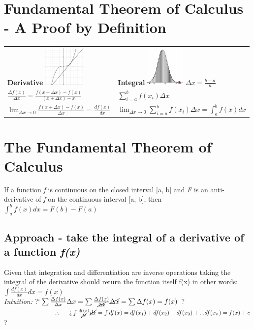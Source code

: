 \documentclass{article}
\author{Uzair Akram}
\begin{document}
\section*{Fundamental Theorem of Calculus - A Proof by Definition}

\begin{tabular}{l l}
\textbf{Derivative}  \hspace{2cm} \includegraphics[height=2cm]{derivative.png} \hspace{2cm}  &  \textbf{Integral}   \hspace{2cm}  \includegraphics[height=2cm]{integral.png}  $\Delta x = \frac{b - a}{n}$ \\
$\frac{\Delta f(x)}{\Delta x} = \frac{f(x + \Delta x) - f(x)}{(x + \Delta x) - x}$  &  $\sum\limits_{i=a}^b f(x_i)\Delta x$ \\
$\lim_{\Delta x\to 0} \frac{f(x + \Delta x) - f(x)}{\Delta x} = \frac{df(x)}{dx}$  &  $\lim_{\Delta x\to 0}\sum\limits_{i=a}^b f(x_i)\Delta x = \int_{a}^b f(x)dx$ \\
\end{tabular}
\section*{The Fundamental Theorem of Calculus}
If a function \emph{f} is continuous on the closed interval [a, b] and \emph{F} is an anti-derivative of \emph{f} on the continuous interval [a, b], then $\int_{a}^b f(x)dx = F(b) - F(a)$
\subsection*{Approach - take the integral of a derivative of a function \emph{f(x)}}
Given that integration and differentiation are inverse operations taking the integral of the derivative should return the function itself f(x) in other words:  $\int \frac{df(x)}{dx}dx = f(x)$ \\
\emph{Intuition: } ?`$\sum\frac{\Delta f(x)}{\Delta x}\Delta x = \sum\frac{\Delta f(x)}{\cancel{\Delta x}}\cancel{\Delta x} = \sum\Delta f(x) = f(x)$ ? \\
\mbox{}$\hspace{3cm} \therefore \hspace{0.5cm} \text{?`}\int \frac{df(x)}{\cancel{dx}}\cancel{dx} = \int df(x) = df(x_1) + df(x_2) + df(x_3) + ... df(x_n) = f(x) + c$ ? \\
\end{document}
